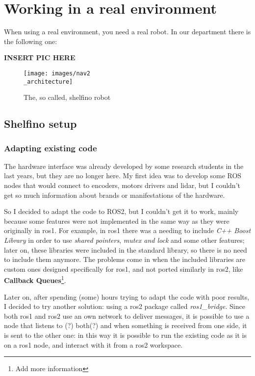 \chapter{Working in a real environment}

\label{cha:realworld}

When using a real environment, you need a real robot. In our department there is the following one:

{\bf INSERT PIC HERE}

\begin{figure}[h]
  \centering
  \texttt{[image: images/nav2\\\_architecture]}
  \caption{The, so called, shelfino robot}
  \label{fig:shelfino}
\end{figure}



\section{Shelfino setup} 

\subsection{Adapting existing code}

The hardware interface was already developed by some research students in the last years, but they are no longer here. My first idea was to develop some ROS nodes that would connect to encoders, motors drivers and lidar, but I couldn't get so much information about brands or manifestations of the hardware.

So I decided to adapt the code to ROS2, but I couldn't get it to work, mainly because some features were not implemented in the same way as they were originally in \Acrshort{ros}1. For example, in \Acrshort{ros}1 there was a needing to include {\it C++ Boost Library} in order to use {\it shared pointers}, {\it mutex and lock} and some other features; later on, these libraries were included in the standard library, so there is no need to include them anymore.
The problems come in when the included libraries are custom ones designed specifically for \Acrshort{ros}1, and not ported similarly in \Acrshort{ros}2, like {\bf Callback Queues}\footnote{Add more information}\cite{migrationguide}.

Later on, after spending (some) hours trying to adapt the code with poor results, I decided to try another solution: using a \Acrshort{ros}2 package called {\it ros1\_bridge}. Since both \Acrshort{ros}1 and \Acrshort{ros}2 use an own network to deliver messages, it is possible to use a node that listens to (?) both(?) and when something is received from one side, it is sent to the other one: in this way it is possible to run the existing code as it is on a \Acrshort{ros}1 node, and interact with it from a \Acrshort{ros}2 workspace.

